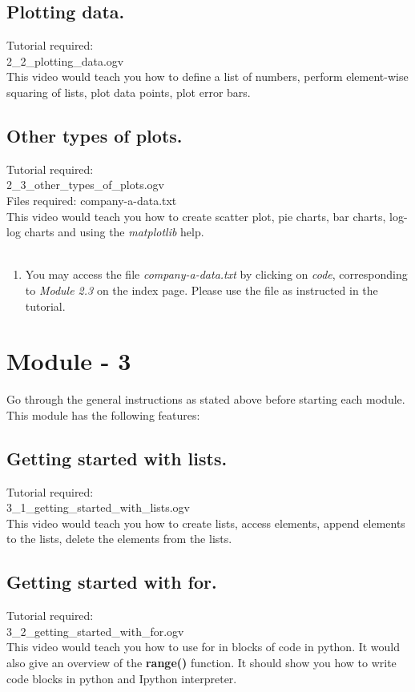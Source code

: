 \documentclass[11pt,twocolumn]{article}
\newenvironment{enumcpt}{\begin{enumerate} \topsep 0pt \partopsep 0pt 
                        \parsep 0pt
                        \itemsep 0pt \leftmargin -1in \rightmargin 0pt
                        }{\end{enumerate}}
\begin{document}
  \subsection{Plotting data.}
  Tutorial required: \\ 2\_2\_plotting\_data.ogv \\
    This video would teach you how to define a list of numbers, perform element-wise squaring of lists, plot data points, plot error bars. 
    \subsection{Other types of plots.}
    Tutorial required:\\ 2\_3\_other\_types\_of\_plots.ogv \\
    Files required: company-a-data.txt \\
    This video would teach you how to create scatter plot, pie charts, bar charts, log-log charts and using the \emph{matplotlib} help.\\ \\
\begin{enumcpt}
\item You may access the file \emph{company-a-data.txt} by clicking on \emph{code}, corresponding to \emph{Module 2.3} on the index page. Please use the file as instructed in the tutorial. 
\end{enumcpt}
  
\section{Module - 3}
Go through the general instructions as stated above before starting each module.\\
This module has the following features:
\subsection{Getting started with lists.}
Tutorial required: \\ 3\_1\_getting\_started\_with\_lists.ogv \\
This video would teach you how to create lists, access elements, append elements to the lists, delete the elements from the lists. 
\subsection{Getting started with for.}
Tutorial required: \\ 3\_2\_getting\_started\_with\_for.ogv \\
This video would teach you how to use for in blocks of code in python. It would also give an overview of the \textbf{range()} function. It should show you how to write code blocks in python and Ipython interpreter. 
\end{document}
